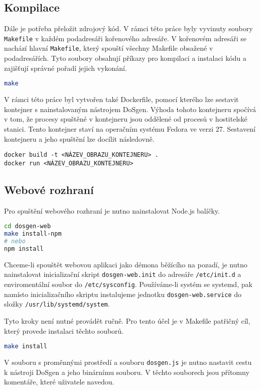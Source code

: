 \subsection{Kompilace}
\noindent Dále je potřeba přeložit zdrojový kód. V rámci této práce byly vyvinuty soubory \texttt{Makefile} v každém podadresáři kořenového adresáře. V kořenovém adresáři se nachází hlavní \texttt{Makefile}, který spouští všechny Makefile obsažené v podadresářích. Tyto soubory obsahují příkazy pro kompilaci a instalaci kódu a zajišťují správné pořadí jejich vykonání.

\begin{lstlisting}[language=bash]
make
\end{lstlisting}

V rámci této práce byl vytvořen také Dockerfile, pomocí kterého lze sestavit kontejner s nainstalovaným nástrojem DoSgen. Výhoda tohoto kontejneru spočívá v tom, že procesy spuštěné v kontejneru jsou oddělené od procesů v hostitelské stanici. Tento kontejner staví na operačním systému Fedora ve verzi 27. Sestavení kontejneru a jeho spuštění lze docílit následovně.
\begin{lstlisting}
docker build -t <NÁZEV_OBRAZU_KONTEJNERU> .
docker run <NÁZEV_OBRAZU_KONTEJNERU>
\end{lstlisting}

\subsection{Webové rozhraní}
Pro spuštění webového rozhraní je nutno nainstalovat Node.js balíčky.
\begin{lstlisting}[language=bash]
cd dosgen-web
make install-npm
# nebo
npm install
\end{lstlisting}

Chceme-li spouštět webovou aplikaci jako démona běžícího na pozadí, je nutno nainstalovat inicializační skript \texttt{dosgen-web.init} do adresáře \texttt{/etc/init.d} a enviromentální soubor do \texttt{/etc/sysconfig}. Používáme-li systém se systemd, pak namísto inicializačního skriptu instalujeme jednotku \texttt{dosgen-web.service} do složky \texttt{/usr/lib/systemd/system}.

Tyto kroky není nutné provádět ručně. Pro tento účel je v Makefile patřičný cíl, který provede instalaci těchto souborů.
\begin{lstlisting}[language=bash]
make install
\end{lstlisting}

V souboru s proměnnými prostředí a souboru \texttt{dosgen.js} je nutno nastavit cestu k nástroji DoSgen a jeho binárnímu souboru. V těchto souborech jsou přítomny komentáře, které uživatele navedou.


